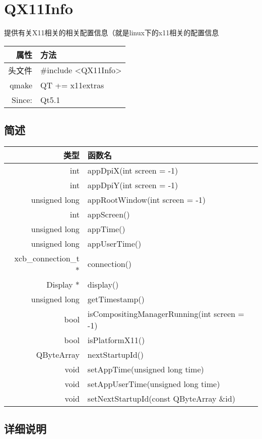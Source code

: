\chapter{QX11Info}

提供有关X11相关的相关配置信息（就是linux下的x11相关的配置信息


\begin{tabular}{|r|l|}
	\hline
	属性 & 方法 \\
	\hline
	头文件 & \#include <QX11Info>\\      
	\hline
	qmake & QT += x11extras\\      
	\hline
    Since: & Qt5.1\\
    \hline
\end{tabular}


\section{简述}

\begin{tabular}{|r|l|}
\hline
类型 & 函数名 \\
\hline
int	& appDpiX(int screen = -1)\\
\hline
int	& appDpiY(int screen = -1) \\
\hline
unsigned long&	appRootWindow(int screen = -1) \\
\hline
int	&appScreen() \\
\hline
unsigned long&	appTime() \\ 
\hline
unsigned long&	appUserTime() \\
\hline
xcb\_connection\_t *	& connection() \\ 
\hline
Display *	&display()\\
\hline
unsigned long &	getTimestamp()\\
\hline
bool &	isCompositingManagerRunning(int screen = -1)\\
\hline
bool &	isPlatformX11() \\ 
\hline
QByteArray	& nextStartupId() \\
\hline
void &	setAppTime(unsigned long time)\\
\hline
void&	setAppUserTime(unsigned long time)\\
\hline
void&	setNextStartupId(const QByteArray \&id)\\
\hline
\end{tabular}

\section{详细说明}

